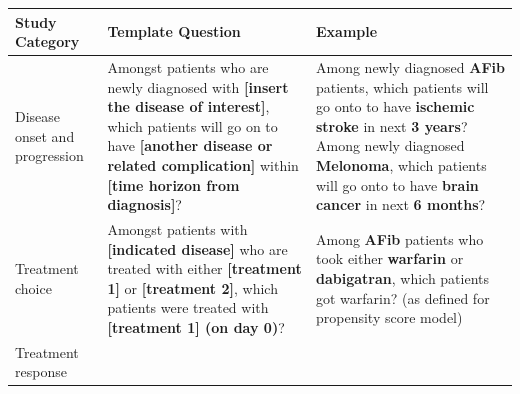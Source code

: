 \documentclass[11pt]{book}
\theoremstyle{definition}
\theoremstyle{definition}
\theoremstyle{definition}
\theoremstyle{remark}
\begin{document}
\begin{longtable}[]{@{}lll@{}}
\toprule
\begin{minipage}[b]{0.30\columnwidth}\raggedright
Study Category\strut
\end{minipage} & \begin{minipage}[b]{0.30\columnwidth}\raggedright
Template Question\strut
\end{minipage} & \begin{minipage}[b]{0.30\columnwidth}\raggedright
Example\strut
\end{minipage}\tabularnewline
\midrule
\endhead
\begin{minipage}[t]{0.30\columnwidth}\raggedright
Disease onset and progression\strut
\end{minipage} & \begin{minipage}[t]{0.30\columnwidth}\raggedright
Amongst patients who are newly diagnosed with \textbf{{[}insert the disease of interest{]}}, which patients will go on to have \textbf{{[}another disease or related complication{]}} within \textbf{{[}time horizon from diagnosis{]}}?\strut
\end{minipage} & \begin{minipage}[t]{0.30\columnwidth}\raggedright
Among newly diagnosed \textbf{AFib} patients, which patients will go onto to have \textbf{ischemic stroke} in next \textbf{3 years}? Among newly diagnosed \textbf{Melonoma}, which patients will go onto to have \textbf{brain cancer} in next \textbf{6 months}?\strut
\end{minipage}\tabularnewline
\begin{minipage}[t]{0.30\columnwidth}\raggedright
Treatment choice\strut
\end{minipage} & \begin{minipage}[t]{0.30\columnwidth}\raggedright
Amongst patients with \textbf{{[}indicated disease{]}} who are treated with either \textbf{{[}treatment 1{]}} or \textbf{{[}treatment 2{]}}, which patients were treated with \textbf{{[}treatment 1{]} (on day 0)}?\strut
\end{minipage} & \begin{minipage}[t]{0.30\columnwidth}\raggedright
Among \textbf{AFib} patients who took either \textbf{warfarin} or \textbf{dabigatran}, which patients got warfarin? (as defined for propensity score model)\strut
\end{minipage}\tabularnewline
\begin{minipage}[t]{0.30\columnwidth}\raggedright
Treatment response\strut
\end{minipage} & \begin{minipage}[t]{0.30\columnwidth}\raggedright

\end{minipage}
\end{longtable}
\end{document}
